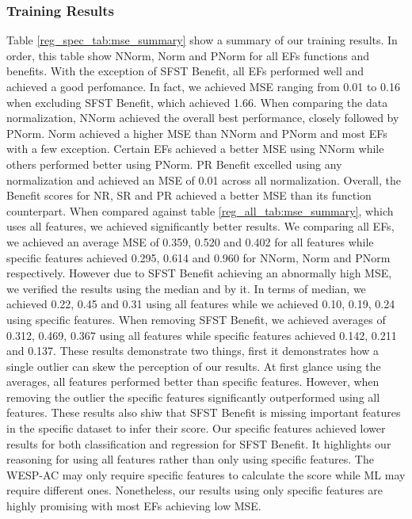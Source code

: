 \documentclass[12pt,letterpaper]{article}
\begin{document}
\subsubsection{Training Results}
Table \ref{reg_spec_tab:mse_summary} show a summary of our training results.
In order, this table show NNorm, Norm and PNorm for all \ac{EF}s functions and benefits.
With the exception of \ac{SFST} Benefit, all \ac{EF}s performed well and achieved a good perfomance.
In fact, we achieved MSE ranging from 0.01 to 0.16 when excluding \ac{SFST} Benefit, which achieved 1.66.
When comparing the data normalization, NNorm achieved the overall best performance, closely followed by PNorm.
Norm achieved a higher MSE than NNorm and PNorm and most \ac{EF}s with a few exception.
Certain \ac{EF}s achieved a better MSE using NNorm while others performed better using PNorm.
\ac{PR} Benefit excelled using any normalization and achieved an MSE of 0.01 across all normalization.
Overall, the Benefit scores for \ac{NR}, \ac{SR} and \ac{PR} achieved a better MSE than its function counterpart.
When compared against table \ref{reg_all_tab:mse_summary}, which uses all features, we achieved significantly better results.
We comparing all \ac{EF}s, we achieved an average MSE of 0.359, 0.520 and 0.402 for all features while specific features achieved 0.295, 0.614 and 0.960 for NNorm, Norm and PNorm respectively.
However due to \ac{SFST} Benefit achieving an abnormally high MSE, we verified the results using the median and by it.
In terms of median, we achieved 0.22, 0.45 and 0.31 using all features while we achieved 0.10, 0.19, 0.24 using specific features.
When removing \ac{SFST} Benefit, we achieved averages of 0.312, 0.469, 0.367 using all features while specific features achieved 0.142, 0.211 and 0.137.
These results demonstrate two things, first it demonstrates how a single outlier can skew the perception of our results.
At first glance using the averages, all features performed better than specific features.
However, when removing the outlier the specific features significantly outperformed using all features.
These results also shiw that \ac{SFST} Benefit is missing important features in the specific dataset to infer their score.
Our specific features achieved lower results for both classification and regression for \ac{SFST} Benefit.
It highlights our reasoning for using all features rather than only using specific features.
The WESP-AC may only require specific features to calculate the score while \ac{ML} may require different ones.
Nonetheless, our results using only specific features are highly promising with most \ac{EF}s achieving low MSE.
\end{document}
